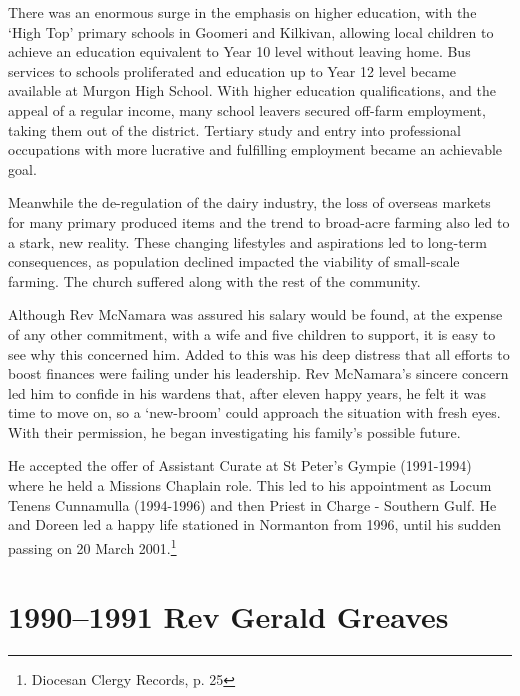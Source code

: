 There was an enormous surge in the emphasis on higher education, with the `High Top' primary schools in Goomeri and Kilkivan, allowing local children to achieve an education equivalent to Year 10 level without leaving home. Bus services to schools proliferated and education up to Year 12 level became available at Murgon High School. With higher education qualifications, and the appeal of a regular income, many school leavers secured off-farm employment, taking them out of the district. Tertiary study and entry into professional occupations with more lucrative and fulfilling employment became an achievable goal.



Meanwhile the de-regulation of the dairy industry, the loss of overseas markets for many primary produced items and the trend to broad-acre farming also led to a stark, new reality. These changing lifestyles and aspirations led to long-term consequences, as population declined impacted the viability of small-scale farming. The church suffered along with the rest of the community.



Although Rev McNamara was assured his salary would be found, at the expense of any other commitment, with a wife and five children to support, it is easy to see why this concerned him. Added to this was his deep distress that all efforts to boost finances were failing under his leadership. Rev McNamara's sincere concern led him to confide in his wardens that, after eleven happy years, he felt it was time to move on, so a `new-broom' could approach the situation with fresh eyes. With their permission, he began investigating his family's possible future.



He accepted the offer of Assistant Curate at St Peter's Gympie (1991-1994) where he held a Missions Chaplain role. This led to his appointment as Locum Tenens Cunnamulla (1994-1996) and then Priest in Charge - Southern Gulf. He and Doreen led a happy life stationed in Normanton from 1996, until his sudden passing on 20 March 2001.\footnote{Diocesan Clergy Records, p. 25}


\section{1990--1991 Rev Gerald Greaves}



\balance


